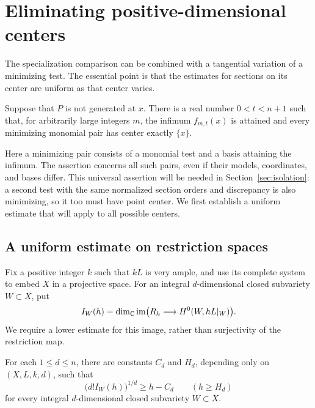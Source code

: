 \section{Eliminating positive-dimensional centers}
\label{sec:centers}

The specialization comparison can be combined with a tangential
variation of a minimizing test. The essential point is that the estimates
for sections on its center are uniform as that center varies.

\begin{proposition}\label{prop:point-center}
Suppose that $P$ is not generated at $x$. There is a real number
$0<t<n+1$ such that, for arbitrarily large integers $m$, the infimum
$f_{m,t}(x)$ is attained and every minimizing monomial pair has center
exactly $\{x\}$.
\end{proposition}

Here a minimizing pair consists of a monomial test and a basis attaining
the infimum. The assertion concerns all such pairs, even if their models,
coordinates, and bases differ. This universal assertion will be needed
in Section~\ref{sec:isolation}: a second test with the same normalized
section orders and discrepancy is also minimizing, so it too must have
point center. We first establish a uniform estimate that will apply to
all possible centers.



\subsection{A uniform estimate on restriction spaces}

Fix a positive integer $k$ such that $kL$ is very ample, and use its
complete system to embed $X$ in a projective space. For an integral
$d$-dimensional closed subvariety $W\subset X$, put
\[
 I_W(h)=\dim_{\mathbb C}\operatorname{im}\bigl(R_h\longrightarrow H^0(W,hL|_W)\bigr).
\]
We require a lower estimate for this image, rather than surjectivity of
the restriction map.

\begin{lemma}\label{lem:uniform-restrictions}
For each $1\le d\le n$, there are constants $C_d$ and $H_d$, depending
only on $(X,L,k,d)$, such that
\begin{equation}\label{eq:uniform-restrictions}
 \bigl(d!I_W(h)\bigr)^{1/d}\ge h-C_d
 \qquad(h\ge H_d)
\end{equation}
for every integral $d$-dimensional closed subvariety $W\subset X$.
\end{lemma}

